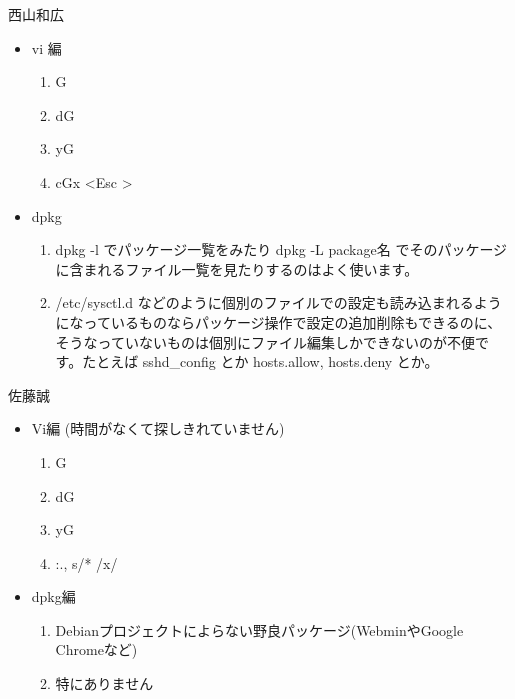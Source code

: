 \documentclass[mingoth,a4paper]{jsarticle}
\begin{document}
\begin{prework}{ 西山和広 }
  \begin{itemize}
  \item vi 編
    \begin{enumerate}
    \item G
    \item dG
    \item yG
    \item cGx \textless Esc \textgreater
    \end{enumerate}
  \item dpkg
    \begin{enumerate}
    \item dpkg -l でパッケージ一覧をみたり dpkg -L package名 でそのパッケージに含まれるファイル一覧を見たりするのはよく使います。
    \item /etc/sysctl.d などのように個別のファイルでの設定も読み込まれるようになっているものならパッケージ操作で設定の追加削除もできるのに、そうなっていないものは個別にファイル編集しかできないのが不便です。たとえば sshd\_config とか hosts.allow, hosts.deny とか。
    \end{enumerate}
  \end{itemize}
\end{prework}

\begin{prework}{ 佐藤誠 }
  \begin{itemize}
  \item Vi編 (時間がなくて探しきれていません)
    \begin{enumerate}
    \item G
    \item dG
    \item yG
    \item :., \textdollar s/* \textdollar /x/
    \end{enumerate}
  \item dpkg編
    \begin{enumerate}
    \item Debianプロジェクトによらない野良パッケージ(WebminやGoogle Chromeなど)
    \item 特にありません
    \end{enumerate}
  \end{itemize}
\end{prework}
\end{document}
